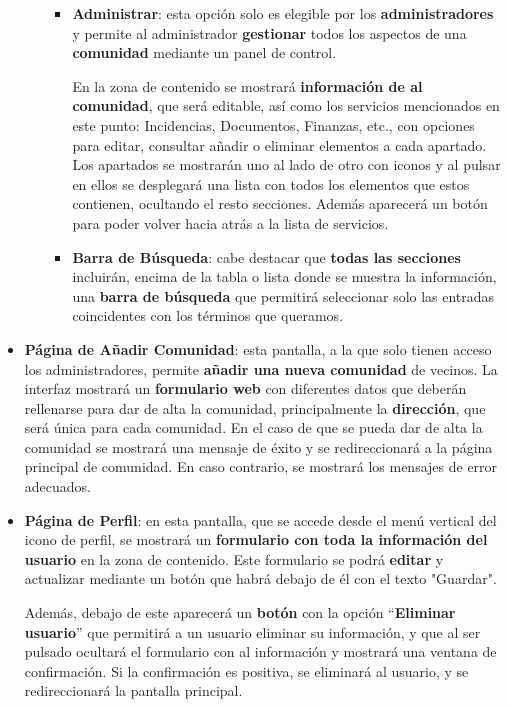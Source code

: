 \begin{appendices}
\begin{itemize}
\begin{itemize}
\begin{itemize}
			\item \textbf{Administrar}: esta opción solo es elegible por los \textbf{administradores} y permite al administrador \textbf{gestionar} todos los aspectos de una \textbf{comunidad} mediante un panel de control.
			
			En la zona de contenido se mostrará \textbf{información de al comunidad}, que será editable, así como los servicios mencionados en este punto: Incidencias, Documentos, Finanzas, etc., con opciones para editar, consultar añadir o eliminar elementos a cada apartado. Los apartados se mostrarán uno al lado de otro con iconos y al pulsar en ellos se desplegará una lista con todos los elementos que estos contienen, ocultando el resto secciones. Además aparecerá un botón para poder volver hacia atrás a la lista de servicios.
						
			\item \textbf{Barra de Búsqueda}: cabe destacar que \textbf{todas las secciones} incluirán, encima de la tabla o lista donde se muestra la información, una \textbf{barra de búsqueda} que permitirá seleccionar solo las entradas coincidentes con los términos que queramos.
		\end{itemize}
	\end{itemize}
		
	
	\item \textbf{Página de Añadir Comunidad}: esta pantalla, a la que solo tienen acceso los administradores, permite \textbf{añadir una nueva comunidad} de vecinos. La interfaz mostrará un \textbf{formulario web} con diferentes datos que deberán rellenarse para dar de alta la comunidad, principalmente la \textbf{dirección}, que será única para cada comunidad. En el caso de que se pueda dar de alta la comunidad se mostrará una mensaje de éxito y se redireccionará a la página principal de comunidad. En caso contrario, se mostrará los mensajes de error adecuados.
	
	\item \textbf{Página de Perfil}: en esta pantalla, que se accede desde el menú vertical del icono de perfil, se mostrará un \textbf{formulario con toda la información del usuario} en la zona de contenido. Este formulario se podrá \textbf{editar} y actualizar mediante un botón que habrá debajo de él con el texto "Guardar". 
	
	Además, debajo de este aparecerá un \textbf{botón} con la opción ``\textbf{Eliminar usuario}'' que permitirá a un usuario eliminar su información, y que al ser pulsado ocultará el formulario con al información y mostrará una ventana de confirmación. Si la confirmación es positiva, se eliminará al usuario, y se redireccionará la pantalla principal.
	

\end{itemize}
\end{appendices}

